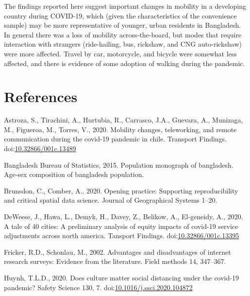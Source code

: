 \documentclass[]{elsarticle} %
\begin{document}
The findings reported here suggest important changes in mobility in a
developing country during COVID-19, which (given the characteristics of
the convenience sample) may be more representative of younger, urban
residents in Bangladesh. In general there was a loss of mobility
across-the-board, but modes that require interaction with strangers
(ride-hailing, bus, rickshaw, and CNG auto-rickshaw) were more affected.
Travel by car, motorcycle, and bicycle were somewhat less affected, and
there is evidence of some adoption of walking during the pandemic.

\hypertarget{references}{%
\section*{References}\label{references}}

\hypertarget{refs}{}
\leavevmode\hypertarget{ref-Astroza2020mobility}{}%
Astroza, S., Tirachini, A., Hurtubia, R., Carrasco, J.A., Guevara, A.,
Munizaga, M., Figueroa, M., Torres, V., 2020. Mobility changes,
teleworking, and remote communication during the covid-19 pandemic in
chile. Transport Findings.
doi:\href{https://doi.org/10.32866/001c.13489}{10.32866/001c.13489}

\leavevmode\hypertarget{ref-Bangladesh2015}{}%
Bangladesh Bureau of Statistics, 2015. Population monograph of
bangladesh. Age-sex composition of bangladesh population.

\leavevmode\hypertarget{ref-Brunsdon2020opening}{}%
Brunsdon, C., Comber, A., 2020. Opening practice: Supporting
reproducibility and critical spatial data science. Journal of
Geographical Systems 1--20.

\leavevmode\hypertarget{ref-DeWeese2020tale}{}%
DeWeese, J., Hawa, L., Demyk, H., Davey, Z., Belikow, A., El-geneidy,
A., 2020. A tale of 40 cities: A preliminary analysis of equity impacts
of covid-19 service adjustments across north america. Tansport Findings.
doi:\href{https://doi.org/10.32866/001c.13395}{10.32866/001c.13395}

\leavevmode\hypertarget{ref-Fricker2002advantages}{}%
Fricker, R.D., Schonlau, M., 2002. Advantages and disadvantages of
internet research surveys: Evidence from the literature. Field methods
14, 347--367.

\leavevmode\hypertarget{ref-Huynh2020culture}{}%
Huynh, T.L.D., 2020. Does culture matter social distancing under the
covid-19 pandemic? Safety Science 130, 7.
doi:\href{https://doi.org/10.1016/j.ssci.2020.104872}{10.1016/j.ssci.2020.104872}
\end{document}
